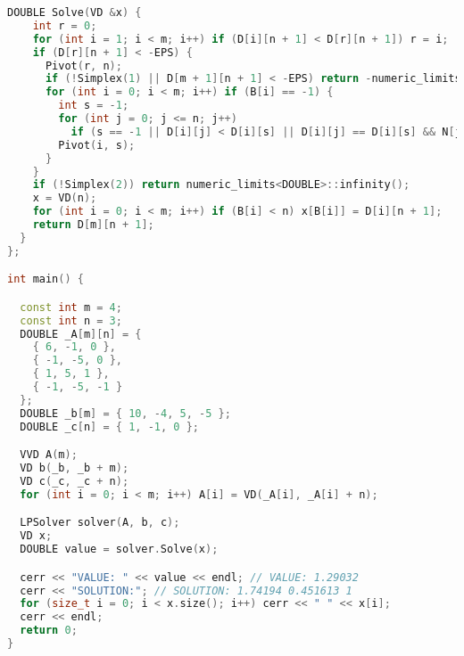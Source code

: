 \begin{lstlisting}[language=C++]
  DOUBLE Solve(VD &x) {
    int r = 0;
    for (int i = 1; i < m; i++) if (D[i][n + 1] < D[r][n + 1]) r = i;
    if (D[r][n + 1] < -EPS) {
      Pivot(r, n);
      if (!Simplex(1) || D[m + 1][n + 1] < -EPS) return -numeric_limits<DOUBLE>::infinity();
      for (int i = 0; i < m; i++) if (B[i] == -1) {
        int s = -1;
        for (int j = 0; j <= n; j++)
          if (s == -1 || D[i][j] < D[i][s] || D[i][j] == D[i][s] && N[j] < N[s]) s = j;
        Pivot(i, s);
      }
    }
    if (!Simplex(2)) return numeric_limits<DOUBLE>::infinity();
    x = VD(n);
    for (int i = 0; i < m; i++) if (B[i] < n) x[B[i]] = D[i][n + 1];
    return D[m][n + 1];
  }
};

int main() {

  const int m = 4;
  const int n = 3;
  DOUBLE _A[m][n] = {
    { 6, -1, 0 },
    { -1, -5, 0 },
    { 1, 5, 1 },
    { -1, -5, -1 }
  };
  DOUBLE _b[m] = { 10, -4, 5, -5 };
  DOUBLE _c[n] = { 1, -1, 0 };

  VVD A(m);
  VD b(_b, _b + m);
  VD c(_c, _c + n);
  for (int i = 0; i < m; i++) A[i] = VD(_A[i], _A[i] + n);

  LPSolver solver(A, b, c);
  VD x;
  DOUBLE value = solver.Solve(x);

  cerr << "VALUE: " << value << endl; // VALUE: 1.29032
  cerr << "SOLUTION:"; // SOLUTION: 1.74194 0.451613 1
  for (size_t i = 0; i < x.size(); i++) cerr << " " << x[i];
  cerr << endl;
  return 0;
}

\end{lstlisting}
